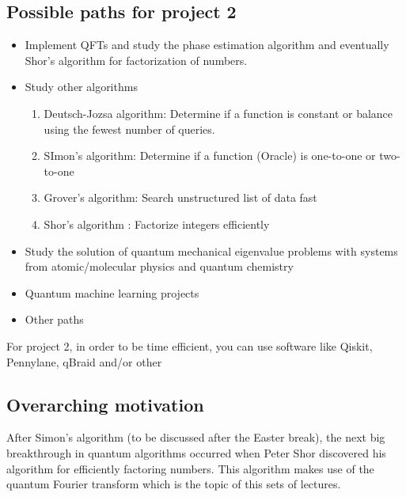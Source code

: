 \documentclass[%
oneside,                 %
final,                   %
10pt]{article}
\begin{document}
\subsection{Possible paths for project 2}

\begin{itemize}
\item Implement QFTs  and study the phase estimation algorithm and eventually Shor's algorithm for factorization of numbers.

\item Study other algorithms
\begin{enumerate}

 \item Deutsch-Jozsa algorithm: Determine if a function is constant or balance using the fewest number of queries.

 \item SImon's algorithm: Determine if a function (Oracle) is one-to-one or two-to-one

 \item Grover's algorithm: Search unstructured list of data fast

 \item Shor's algorithm : Factorize integers efficiently

\end{enumerate}

\noindent
\item Study the solution of quantum mechanical eigenvalue problems with systems from atomic/molecular physics and quantum chemistry

\item Quantum machine learning projects

\item Other paths
\end{itemize}

\noindent
For project 2, in order to be time efficient, you can use software like Qiskit, Pennylane, qBraid and/or other

\subsection{Overarching motivation}

After Simon's algorithm (to be discussed after the Easter break), the next big breakthrough in quantum
algorithms occurred when Peter Shor discovered his algorithm for
efficiently factoring numbers. This algorithm makes use of the quantum
Fourier transform which is the topic of this sets of lectures.
\end{document}
